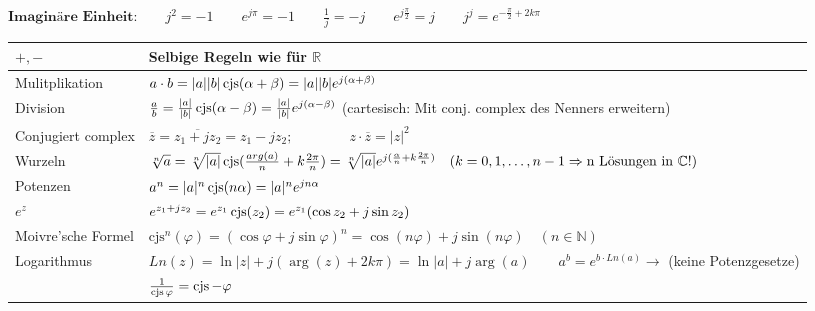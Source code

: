 $\textbf{Imaginäre Einheit:} \qquad j^2 = -1 \qquad e^{j\pi} = -1 \qquad \frac{1}{j} = -j \qquad e^{j\frac{\pi}{2}}= j \qquad j^j = e^{-\frac{\pi}{2}+2k\pi}$


\renewcommand{\arraystretch}{1.5}
\begin{tabular}{| l | l |}
\hline
	$+, -$
	& Selbige Regeln wie für $\mathbb{R}$\\

\hline
	Mulitplikation
	&$a \cdot b = 
		|a| |b| \operatorname{cjs}(\alpha + \beta) = 
		|a| |b| e^{j(\alpha + \beta)}$\\

\hline
	Division
	&$\frac{a}{b} = 
		\frac{\left|a\right|}{\left|b\right|} \operatorname{cjs}(\alpha - \beta) =
		\frac{\left|a\right|}{\left|b\right|} e^{j(\alpha - \beta)}$ (cartesisch: Mit
		conj. complex des Nenners erweitern) \\

\hline
	Conjugiert complex
	&$\overline{z} = \overline{z_1 + jz_2} = z_1 - jz_2; \qquad \qquad z \cdot \overline{z} = |z|^2$\\

\hline
	Wurzeln
	&$\sqrt[n]{a} = \sqrt[n]{|a|} \operatorname{cjs}(\frac{arg(a)}{n}+k\frac{2\pi}{n}) = 
	\sqrt[n]{|a|} e^{j(\frac{\alpha}{n} + k \frac{2\pi}{n})} \quad (k = 0, 1,
	\ldots, n-1 \Rightarrow \text{n Lösungen in } \mathbb{C} !)$ \\

\hline
	Potenzen
	&$a^n = |a|^n \operatorname{cjs}(n\alpha) = 
	|a|^n e^{jn\alpha}$\\

\hline
	$e^z$ &$e^{z_1+jz_2} = e^{z_1} \operatorname{cjs}(z_2) = e^{z_1} (\cos{z_2} + j\sin{z_2})$\\

\hline
	Moivre'sche Formel
	&$\text{cjs}^n(\varphi) =
	(\cos{\varphi} + j\sin{\varphi})^n = 
	\cos(n\varphi) +j\sin(n\varphi) \quad (n \in \mathbb{N})$\\

\hline
	Logarithmus
	&$Ln(z) = \ln{|z|} + j (\arg(z) + 2k \pi)=\ln|a|+j\arg(a) \qquad a^b = e^{b\cdot Ln(a)} \rightarrow$ (keine Potenzgesetze) \\

\hline
	& $\frac{1}{\operatorname{cjs}{\varphi}} = \operatorname{cjs}{-\varphi}$ \\
\hline
\end{tabular}
\renewcommand{\arraystretch}{1}\\

